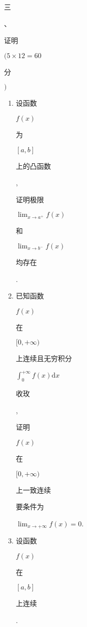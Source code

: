 \documentclass[10pt]{article}
\begin{document}
\begin{CJK}{UTF8}{mj}三\end{CJK}、\begin{CJK}{UTF8}{mj}证明\end{CJK} $(5 \times 12=60$ \begin{CJK}{UTF8}{mj}分\end{CJK} $)$

\begin{enumerate}
  \item \begin{CJK}{UTF8}{mj}设函数\end{CJK} $f(x)$ \begin{CJK}{UTF8}{mj}为\end{CJK} $[a, b]$ \begin{CJK}{UTF8}{mj}上的凸函数\end{CJK}, \begin{CJK}{UTF8}{mj}证明极限\end{CJK} $\lim _{x \rightarrow a^{+}} f(x)$ \begin{CJK}{UTF8}{mj}和\end{CJK} $\lim _{x \rightarrow b^{-}} f(x)$ \begin{CJK}{UTF8}{mj}均存在\end{CJK}.

  \item \begin{CJK}{UTF8}{mj}已知函数\end{CJK} $f(x)$ \begin{CJK}{UTF8}{mj}在\end{CJK} $[0,+\infty)$ \begin{CJK}{UTF8}{mj}上连续且无穷积分\end{CJK} $\int_{0}^{+\infty} f(x) \mathrm{d} x$ \begin{CJK}{UTF8}{mj}收玫\end{CJK}, \begin{CJK}{UTF8}{mj}证明\end{CJK} $f(x)$ \begin{CJK}{UTF8}{mj}在\end{CJK} $[0,+\infty)$ \begin{CJK}{UTF8}{mj}上一致连续\end{CJK} \begin{CJK}{UTF8}{mj}要条件为\end{CJK} $\lim _{x \rightarrow+\infty} f(x)=0$.

  \item \begin{CJK}{UTF8}{mj}设函数\end{CJK} $f(x)$ \begin{CJK}{UTF8}{mj}在\end{CJK} $[a, b]$ \begin{CJK}{UTF8}{mj}上连续\end{CJK}.

\end{enumerate}
\end{document}
